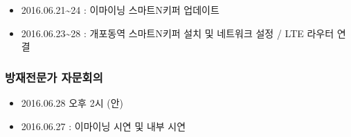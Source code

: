 \documentclass[]{article}
\begin{document}
\begin{itemize}
\itemsep1pt\parskip0pt
\item
  2016.06.21\textasciitilde{}24 : 이마이닝 스마트N키퍼 업데이트
\item
  2016.06.23\textasciitilde{}28 : 개포동역 스마트N키퍼 설치 및 네트워크
  설정 / LTE 라우터 연결
\end{itemize}

\subsubsection{방재전문가
자문회의}\label{uxbc29uxc7acuxc804uxbb38uxac00-uxc790uxbb38uxd68cuxc758}

\begin{itemize}
\itemsep1pt\parskip0pt
\item
  2016.06.28 오후 2시 (안)
\item
  2016.06.27 : 이마이닝 시연 및 내부 시연
\end{itemize}
\end{document}
